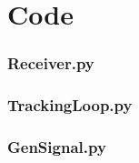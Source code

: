 \label{app7}
\chapter{Code}

\subsection{Receiver.py}


\subsection{TrackingLoop.py}


\subsection{GenSignal.py}


